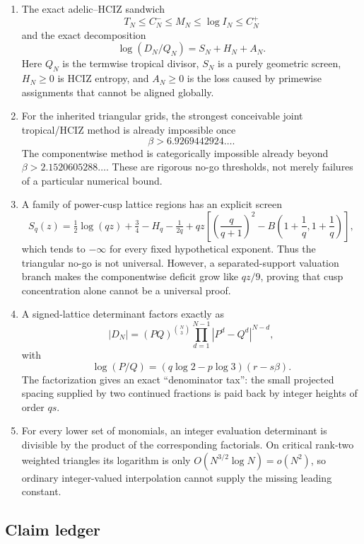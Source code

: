 \documentclass[11pt]{article}
\newcommand{\1}{\mathbf 1}
\theoremstyle{plain}
\theoremstyle{definition}
\theoremstyle{remark}
\begin{document}
\begin{resultbox}
\begin{enumerate}[leftmargin=2.2em]
\item The exact adelic--HCIZ sandwich
\[
 T_N\le C_N^-\le M_N\le\log I_N\le C_N^+
\]
and the exact decomposition
\[
 \log(D_N/Q_N)=S_N+H_N+A_N.
\]
Here $Q_N$ is the termwise tropical divisor, $S_N$ is a purely geometric
screen, $H_N\ge0$ is HCIZ entropy, and $A_N\ge0$ is the loss caused by
primewise assignments that cannot be aligned globally.

\item For the inherited triangular grids, the strongest conceivable joint
tropical/HCIZ method is already impossible once
\[
 \beta>6.9269442924\ldots.
\]
The componentwise method is categorically impossible already beyond
$\beta>2.1520605288\ldots$.  These are rigorous no-go thresholds, not merely
failures of a particular numerical bound.

\item A family of power-cusp lattice regions has an explicit screen
\[
 S_q(z)=\tfrac12\log(qz)+\tfrac34-H_q-\tfrac1{2q}
       +qz\left[\left(\frac q{q+1}\right)^2
       -B\!\left(1+\frac1q,1+\frac1q\right)\right],
\]
which tends to $-\infty$ for every fixed hypothetical exponent.  Thus the
triangular no-go is not universal.  However, a separated-support valuation
branch makes the componentwise deficit grow like $qz/9$, proving that cusp
concentration alone cannot be a universal proof.

\item A signed-lattice determinant factors exactly as
\[
 |D_N|=(PQ)^{\binom N3}
       \prod_{d=1}^{N-1}|P^d-Q^d|^{N-d},
\]
with
\[
 \log(P/Q)=(q\log2-p\log3)(r-s\beta).
\]
The factorization gives an exact ``denominator tax'': the small projected
spacing supplied by two continued fractions is paid back by integer heights
of order $qs$.

\item For every lower set of monomials, an integer evaluation determinant is
divisible by the product of the corresponding factorials.  On critical
rank-two weighted triangles its logarithm is only
$O(N^{3/2}\log N)=o(N^2)$, so ordinary integer-valued interpolation cannot
supply the missing leading constant.
\end{enumerate}
\end{resultbox}

\subsection{Claim ledger}
\end{document}
